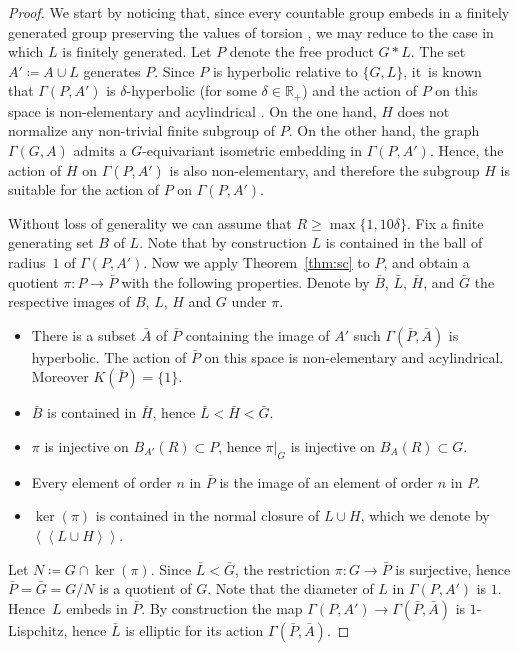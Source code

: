 \documentclass[JEP,XML,SOM,Unicode]{cedram}
\theoremstyle{definition}
\newcommand{\normal}[1]{\left<\! \left< #1\right> \!\right>}
\begin{document}
\begin{proof}
We start by noticing that, since every countable group embeds in a finitely generated group preserving the values of torsion \cite[Th.\,IV.3.1]{Lyndon:2001wm}, we may reduce to the case in which $L$ is finitely generated.
Let $P$ denote the free product $G \ast L$.
The set $A' \coloneqq A \cup L$ generates $P$.
Since $P$ is hyperbolic relative to $\{G,L\}$, it~is known that $\Gamma(P,A')$ is $\delta$-hyperbolic (for some $\delta \in \mathbb R_+$) and the action of $P$ on this space is non-elementary and acylindrical \cite[Th.\,2.7]{Abbott:2019aa}.
On the one hand, $H$ does not normalize any non-trivial finite subgroup of $P$.
On the other hand, the graph $\Gamma(G,A)$ admits a $G$-equivariant isometric embedding in $\Gamma(P,A')$.
Hence, the action of $H$ on $\Gamma(P, A')$ is also non-elementary, and therefore the subgroup $H$ is suitable for the action of $P$ on $\Gamma(P,A')$. 

Without loss of generality we can assume that $R \geq \max\{ 1, 10\delta\}$.
Fix a finite generating set $B$ of $L$.
Note that by construction $L$ is contained in the ball of radius~$1$ of $\Gamma(P, A')$.
Now we apply Theorem~\ref{thm:sc} to $P$, and obtain a quotient $\pi : P \to \bar{P}$ with the following properties.
Denote by $\bar B$, $\bar L$, $\bar H$, and $\bar G$ the respective images of $B$, $L$, $H$ and $G$ under $\pi$.
\begin{itemize}
\item There is a subset $\bar A$ of $\bar P$ containing the image of $A'$ such $\Gamma(\bar P, \bar A)$ is hyperbolic.
The action of $\bar P$ on this space is non-elementary and acylindrical.
Moreover \hbox{$K(\bar P) = \{1\}$}.
\item $\bar B$ is contained in $\bar H$, hence $\bar L < \bar H < \bar G$.
\item $\pi$ is injective on $B_{A'}(R) \subset P$, hence $\pi|_G$ is injective on $B_A(R) \subset G$.
\item Every element of order $n$ in $\bar{P}$ is the image of an element of order $n$ in $P$.
\item $\ker(\pi)$ is contained in the normal closure of $L\cup H$, which we denote by $\normal{L\cup H}$.
\end{itemize}
Let $N \coloneqq G \cap \ker(\pi)$.
Since $\bar L < \bar G$, the restriction $\pi : G \to \bar P$ is surjective, hence $\bar P = \bar G = G/N$ is a quotient of $G$.
Note that the diameter of $L$ in $\Gamma(P,A')$ is $1$.
Hence~$L$ embeds in $\bar P$.
By construction the map $\Gamma(P, A') \to \Gamma(\bar P, \bar A)$ is $1$-Lispchitz, hence $\bar L$ is elliptic for its action $\Gamma(\bar P, \bar A)$.


\end{proof}
\end{document}
